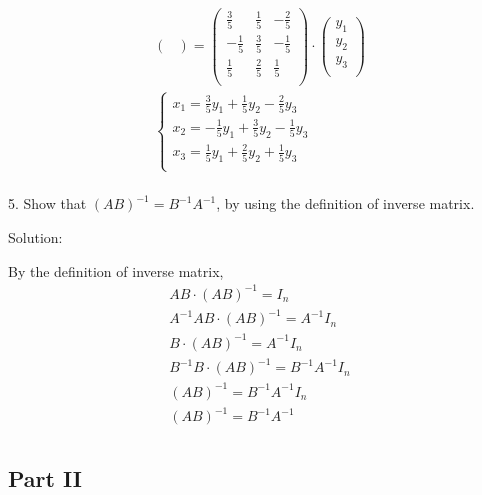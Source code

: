 \documentclass{article}
\begin{document}
\begin{gather*}
\begin{pmatrix}
  \end{pmatrix} = 
  \begin{pmatrix}
    \frac{3}{5} & \frac{1}{5} & -\frac{2}{5} \\
    -\frac{1}{5} & \frac{3}{5} & -\frac{1}{5} \\
    \frac{1}{5} & \frac{2}{5} & \frac{1}{5} \\ 
  \end{pmatrix} \cdot
  \begin{pmatrix}
    y_1 \\
    y_2 \\
    y_3 \\
  \end{pmatrix} \\
  \begin{cases}
    x_1 = \frac{3}{5}y_1 + \frac{1}{5}y_2 - \frac{2}{5}y_3 \\
    x_2 = -\frac{1}{5}y_1 + \frac{3}{5}y_2 - \frac{1}{5}y_3 \\
    x_3 = \frac{1}{5}y_1 + \frac{2}{5}y_2 + \frac{1}{5}y_3 \\ 
  \end{cases} \\
\end{gather*}

5. Show that $(AB)^{-1} = B^{-1}A^{-1}$, by using the definition of inverse 
matrix.

Solution:

By the definition of inverse matrix,
\begin{gather*}
  AB \cdot (AB)^{-1} = I_n \\
  A^{-1}AB \cdot (AB)^{-1} = A^{-1}I_n \\
  B \cdot (AB)^{-1} = A^{-1}I_n \\
  B^{-1}B \cdot (AB)^{-1} = B^{-1}A^{-1}I_n \\
  (AB)^{-1} = B^{-1}A^{-1}I_n \\
  (AB)^{-1} = B^{-1}A^{-1} \\
\end{gather*}

\begin{center}
\section*{Part II}
\end{center}
\end{document}
